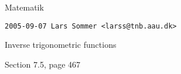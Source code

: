 


{\Large Matematik}

\verb,2005-09-07 Lars Sommer <larss@tnb.aau.dk>,

{\large Inverse trigonometric functions}

Section 7.5, page 467





